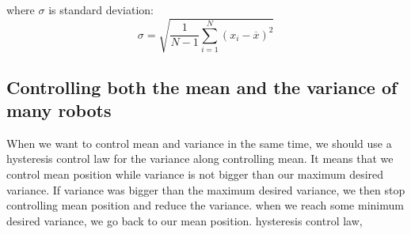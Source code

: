 where $\sigma$ is standard deviation:
\begin{equation}
\sigma = \sqrt{\frac{1}{N-1} \sum_{i=1}^N (x_i - \overline{x})^2}
\end{equation}

\subsection{Controlling both the mean and the variance of many robots}

When we want to control mean and variance in the same time, we should use a hysteresis control law for the variance along controlling mean. It means that we control mean position while variance is not bigger than our maximum desired variance. If variance was bigger than the maximum desired variance, we then stop controlling mean position and reduce the variance. when we reach some minimum desired variance, we go back to our mean position. 
hysteresis control law, \cite{sadra2014}

\begin{equation}
\label{eq:hysteresisControlLaw}
\end{equation}







